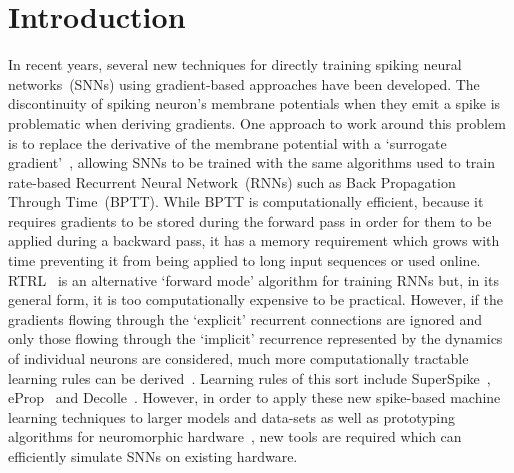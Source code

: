 \documentclass[sigconf,authordraft]{acmart}
\begin{document}


\maketitle

\section{Introduction}
In recent years, several new techniques for directly training spiking neural networks~(SNNs) using gradient-based approaches have been developed.
The discontinuity of spiking neuron's membrane potentials when they emit a spike is problematic when deriving gradients.
One approach to work around this problem is to replace the derivative of the membrane potential with a `surrogate gradient'~\citep{Bohte2011,Bellec2018,Zenke2021a}, allowing SNNs to be trained with the same algorithms used to train rate-based Recurrent Neural Network~(RNNs) such as Back Propagation Through Time~(BPTT).
While BPTT is computationally efficient, because it requires gradients to be stored during the forward pass in order for them to be applied during a backward pass, it has a memory requirement which grows with time preventing it from being applied to long input sequences or used online.
RTRL~\citep{Williams1989} is an alternative `forward mode' algorithm for training RNNs but, in its general form, it is too computationally expensive to be practical.
However, if the gradients flowing through the `explicit' recurrent connections are ignored and only those flowing through the `implicit' recurrence represented by the dynamics of individual neurons are considered, much more computationally tractable learning rules can be derived~\citep{Zenke2021}.
Learning rules of this sort include SuperSpike~\citep{Zenke2018}, eProp~\citep{Bellec2020} and Decolle~\citep{Kaiser2020}.
However, in order to apply these new spike-based machine learning techniques to larger models and data-sets as well as prototyping algorithms for neuromorphic hardware~\citep{Davies2018,Furber2014,Merolla2014}, new tools are required which can efficiently simulate SNNs on existing hardware. 
\end{document}
